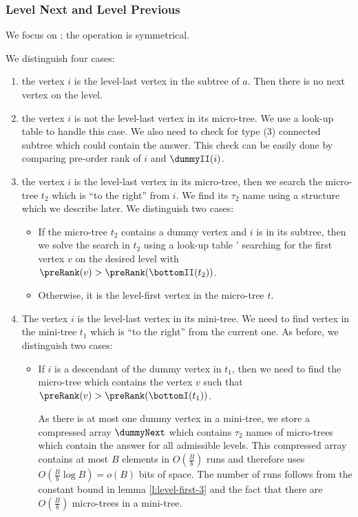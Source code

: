 \subsubsection{Level Next and Level Previous}

We focus on \levelNext{}; the operation \levelPrev{} is symmetrical.

We distinguish four cases:
\begin{enumerate}
	\item the vertex $i$ is the level-last vertex in the subtree of $a$.
	Then there is no next vertex on the level.
	
	\item the vertex $i$ is not the level-last vertex in its micro-tree.
	We use a look-up table to handle this case.
	We also need to check for type (3) connected subtree which could contain the answer.
	This check can be easily done by comparing pre-order rank of $i$ and $\dummyII(i)$.
	
	\item the vertex $i$ is the level-last vertex in its micro-tree, then we search the micro-tree $t_2$ which is ``to the right'' from $i$.
	We find its $\tau_2$ name using a structure which we describe later.
	We distinguish two cases:
	\begin{itemize}
		\item If the micro-tree $t_2$ contains a dummy vertex and $i$ is in its subtree, then we solve the search in $t_2$ using a look-up table \levelNext' searching for the first vertex $v$ on the desired level with $\preRank(v) > \preRank(\bottomII(t_2))$.
		\item Otherwise, it is the level-first vertex in the micro-tree $t$.
	\end{itemize}

	\item The vertex $i$ is the level-last vertex in its mini-tree.
	We need to find vertex in the mini-tree $t_1$ which is ``to the right'' from the current one.
	As before, we distinguish two cases:
	\begin{itemize}
		\item If $i$ is a descendant of the dummy vertex in $t_1$, then we need to find the micro-tree which contains the vertex $v$ such that $\preRank(v) > \preRank(\bottomI(t_1))$.
		
		As there is at most one dummy vertex in a mini-tree, we store a compressed array $\dummyNext$ which contains $\tau_2$ names of micro-trees which contain the answer for all admissible levels.
		This compressed array contains at most $B$ elements in $O(\frac{B}{b})$ runs and therefore uses $O(\frac{B}{b} \log B) = o(B)$ bits of space.
		The number of runs follows from the constant bound in lemma \ref{l:level-first-3} and the fact that there are $O(\frac{B}{b})$ micro-trees in a mini-tree.


\end{itemize}
\end{enumerate}
